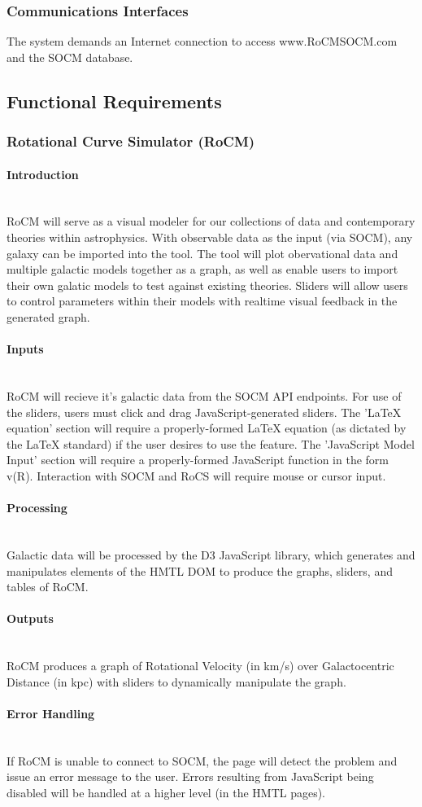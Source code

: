 \documentclass[titlepage]{article}
\newcommand{\myparagraph}[1]{\paragraph{#1}\mbox{}\\}
\begin{document}
\subsubsection{Communications Interfaces}
The system demands an Internet connection to access www.RoCMSOCM.com and the SOCM database.

\subsection{Functional Requirements}
\subsubsection{Rotational Curve Simulator (RoCM)}

\myparagraph{Introduction}
RoCM will serve as a visual modeler for our collections of data and contemporary theories within astrophysics. With observable data as the input (via SOCM), any galaxy can be imported into the tool. The tool will plot obervational data and multiple galactic models together as a graph, as well as enable users to import their own galatic models to test against existing theories. Sliders will allow users to control parameters within their models with realtime visual feedback in the generated graph.

\myparagraph{Inputs}
RoCM will recieve it's galactic data from the SOCM API endpoints. For use of the sliders, users must click and drag JavaScript-generated sliders. The 'LaTeX equation' section will require a properly-formed LaTeX equation (as dictated by the LaTeX standard) if the user desires to use the feature. The 'JavaScript Model Input' section will require a properly-formed JavaScript function in the form v(R). Interaction with SOCM and RoCS will require mouse or cursor input.

\myparagraph{Processing}
Galactic data will be processed by the D3 JavaScript library, which generates and manipulates elements of the HMTL DOM to produce the graphs, sliders, and tables of RoCM.

\myparagraph{Outputs}
RoCM produces a graph of Rotational Velocity (in km/s) over Galactocentric Distance (in kpc) with sliders to dynamically manipulate the graph.

\myparagraph{Error Handling}
If RoCM is unable to connect to SOCM, the page will detect the problem and issue an error message to the user. Errors resulting from JavaScript being disabled will be handled at a higher level (in the HMTL pages).
\end{document}
